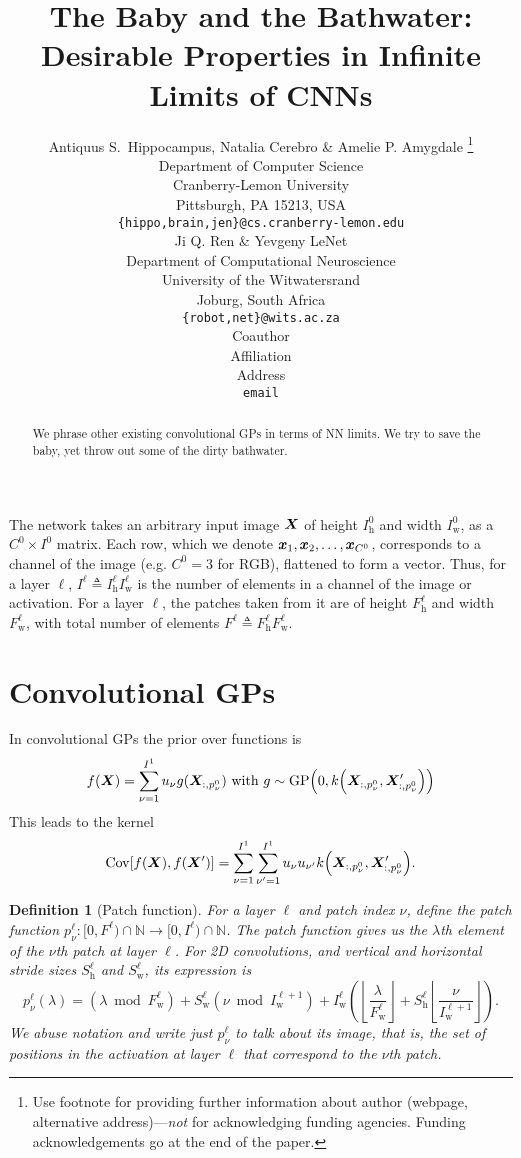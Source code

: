 \documentclass{article} %
\title{The Baby and the Bathwater: 
Desirable Properties in Infinite Limits of CNNs}
\author{Antiquus S.~Hippocampus, Natalia Cerebro \& Amelie P. Amygdale \thanks{ Use footnote for providing further information
about author (webpage, alternative address)---\emph{not} for acknowledging
funding agencies.  Funding acknowledgements go at the end of the paper.} \\
Department of Computer Science\\
Cranberry-Lemon University\\
Pittsburgh, PA 15213, USA \\
\texttt{\{hippo,brain,jen\}@cs.cranberry-lemon.edu} \\
\And
Ji Q. Ren \& Yevgeny LeNet \\
Department of Computational Neuroscience \\
University of the Witwatersrand \\
Joburg, South Africa \\
\texttt{\{robot,net\}@wits.ac.za} \\
\AND
Coauthor \\
Affiliation \\
Address \\
\texttt{email}
}
\newcommand{\bracket}[3]{{\left#1 #3 \right#2}}
\newcommand{\bra}{\bracket{(}{)}}
\newcommand{\sqb}{\bracket{[}{]}}
\newcommand{\floor}{\bracket{\lfloor}{\rfloor}}
\newcommand{\ssup}[1]{^{#1}}
\newcommand{\GP}[1]{{\text{GP}\bra{#1}}}
\newcommand{\eqdef}{\triangleq}
\newcommand{\patch}[2]{{p\ssup{#1}_{#2}}}
\newcommand{\p}[2]{{\patch{\ell #1}{\nu #2}\bra{\lambda}}}
\newcommand{\Iw}[1]{{I\ssup{#1}_\text{w}}}
\newcommand{\Iwl}[1]{\Iw{\ell #1}}
\newcommand{\Ih}[1]{{I\ssup{#1}_\text{h}}}
\newcommand{\Ihl}[1]{\Ih{\ell #1}}
\newcommand{\Sw}[1]{{S\ssup{#1}_\text{w}}}
\newcommand{\Swl}[1]{\Sw{\ell #1}}
\newcommand{\Sh}[1]{{S\ssup{#1}_\text{h}}}
\newcommand{\Shl}[1]{\Sh{\ell #1}}
\newcommand{\Fw}[1]{{F\ssup{#1}_\text{w}}}
\newcommand{\Fwl}[1]{\Fw{\ell #1}}
\newcommand{\Fh}[1]{{F\ssup{#1}_\text{h}}}
\newcommand{\Fhl}[1]{\Fh{\ell #1}}
\newcommand{\chan}[1]{{C\ssup{#1}}}
\newtheorem{definition}[theorem]{Definition}
\begin{document}
\maketitle

\begin{abstract}
  We phrase other existing convolutional GPs in terms of NN limits. We try to
  save the baby, yet throw out some of the dirty bathwater.
\end{abstract}

The network takes an arbitrary input image ${\bm{X}}$ of height $\Ih{0}$ and width
$\Iw{0}$, as a $\chan{0} \times I\ssup{0}$ matrix. Each row, which we denote
$\vx_1,\vx_2,\dotsc,\vx_{\chan{0}}$, corresponds to a channel of the image (e.g.
$\chan{0} = 3$ for RGB), flattened to form a vector. Thus, for a layer $\ell$, $I\ssup{\ell} \eqdef
\Ihl{}\Iwl{}$ is the number of elements in a channel of the image or activation.
For a layer $\ell$, the patches taken from it are of height $\Fhl{}$ and width
$\Fwl{}$, with total number of elements $F\ssup{\ell} \eqdef \Fhl{}\Fwl{}$.

\section{Convolutional GPs}

In convolutional GPs \citep{markvdw2017convolutional} the prior over functions is
\begin{equation}
  f(\mX) = \sum_{\nu=1}^{I\ssup{1}} \evu_\nu g(\mX_{:, p\ssup{0}_\nu}) \text{ with } g \sim \GP{0, k\bra{\mX_{:, p\ssup{0}_\nu}, \mX'_{:, p\ssup{0}_\nu}}}
\end{equation}
This leads to the kernel 
\begin{equation}
  \Cov\sqb{f(\mX), f(\mX')} = \sum_{\nu=1}^{I\ssup{1}}\sum_{\nu'=1}^{I\ssup{1}} \evu_{\nu} \evu_{\nu'} k\bra{\mX_{:, p\ssup{0}_\nu}, \mX'_{:, p\ssup{0}_\nu}}.
\end{equation}

\begin{definition}[Patch function]
  For a layer $\ell$ and patch index $\nu$, define the patch function $p\ssup{\ell}_\nu: [0, F\ssup{\ell})
  \cap \mathbb{N} \to [0, I\ssup{\ell}) \cap \mathbb{N}$.
  The patch function gives us the $\lambda$th element of the $\nu$th patch at layer
  $\ell$. For 2D convolutions, and vertical and horizontal stride sizes $\Shl{}$ and $\Swl{}$,
  its expression is
  \begin{equation}
    \p{}{}{}
    = \bra{\lambda \bmod \Fwl{}} + \Swl{}\bra{\nu\bmod \Iwl{+1}}
    + \Iwl{}\bra{\floor{\frac{\lambda}{\Fwl{}}} + \Shl{} \floor{\frac{\nu}{\Iwl{+1}}}}.
  \end{equation}
  We abuse notation and write just $p\ssup{\ell}_\nu$ to talk about its image, that is,
  the set of positions in the activation at layer $\ell$ that correspond to the $\nu$th patch.
  \label{def:patch-function}
\end{definition}
\end{document}

